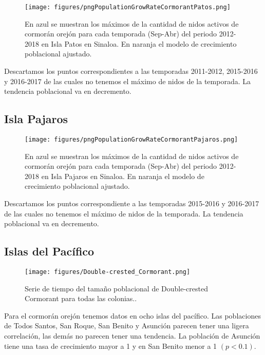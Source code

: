 \documentclass{article} %
\begin{document}
\begin{figure}[H]
\hspace{-2cm}
    \texttt{[image: figures/pngPopulationGrowRateCormorantPatos.png]}
\caption{En azul se muestran los máximos de la cantidad de nidos activos de cormorán orejón para cada temporada (Sep-Abr) del periodo 2012-2018 en Isla Patos en Sinaloa. En naranja el modelo de crecimiento poblacional ajustado.}
\end{figure}

Descartamos los puntos correspondientes a las temporadas 2011-2012, 2015-2016 y 2016-2017 de las cuales no tenemos el máximo de nidos de la temporada. La tendencia poblacional va en decremento.


\subsection*{Isla Pajaros}

\begin{figure}[H]
\hspace{-2cm}
    \texttt{[image: figures/pngPopulationGrowRateCormorantPajaros.png]}
\caption{En azul se muestran los máximos de la cantidad de nidos activos de cormorán orejón para cada temporada (Sep-Abr) del periodo 2012-2018 en Isla Pajaros en Sinaloa. En naranja el modelo de crecimiento poblacional ajustado.}
\end{figure}

Descartamos los puntos correspondiente a las temporadas 2015-2016 y 2016-2017 de las cuales no tenemos el máximo de nidos de la temporada. La tendencia poblacional va en decremento.


\subsection*{Islas del Pacífico}

\begin{figure}[H]
\hspace{-2cm}
    \texttt{[image: figures/Double-crested\_Cormorant.png]}
\caption{Serie de tiempo del tamaño poblacional de Double-crested Cormorant para todas las colonias..}
\end{figure}

Para el cormorán orejón tenemos datos en ocho islas del pacífico. Las poblaciones de Todos Santos, San Roque, San Benito y Asunción parecen tener una ligera correlación, las demás no parecen tener una tendencia. La población de Asunción tiene una tasa de crecimiento mayor a 1 y en San Benito menor a 1 $(p < 0.1)$.

 

\end{document}
